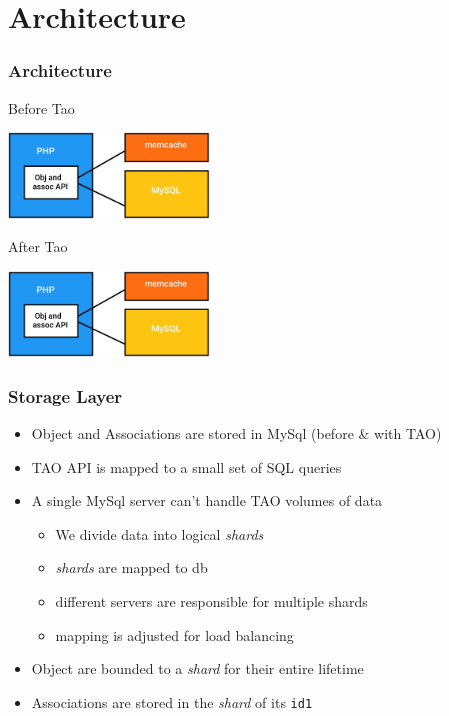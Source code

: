 \section{Architecture}
\begin{frame}[t]
\frametitle{Architecture}
    Before Tao
    \begin{center}
    	\includegraphics[width=0.4\textwidth]{figs/before_tao.jpg}
    \end{center}
	After Tao
	\onslide<2>\begin{center}
    	\includegraphics[width=0.4\textwidth]{figs/before_tao.jpg}
    \end{center}
\end{frame}

\begin{frame}[fragile]
\frametitle{Storage Layer}
\begin{itemize}
	\item Object and Associations are stored in MySql (before \& with TAO)	
	\item TAO API is mapped to a small set of SQL queries
	\item A single MySql server can't handle TAO volumes of data
	\begin{itemize}
		\item We divide data into logical \emph{shards}
		\item \emph{shards} are mapped to db 
		\item different servers are responsible for multiple shards
		\item mapping is adjusted for load balancing
	\end{itemize}
	\item Object are bounded to a \emph{shard} for their entire lifetime
	\item Associations are stored in the \emph{shard} of its \verb!id1!
\end{itemize}




    


\end{frame}
